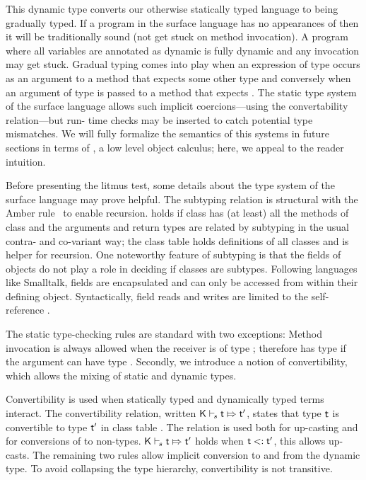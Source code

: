 \documentclass[USenglish]{tex/lipics-v2016}
\begin{document}
This dynamic type converts our otherwise statically typed language to being
gradually typed. If a program in the surface language has no appearances of
\any then it will be traditionally sound (not get stuck on method invocation).
A program where all variables are annotated as dynamic is fully dynamic and
any invocation may get stuck. Gradual typing comes into play when an
expression  of type \any occurs as an argument to a method that expects some
other type \C  and conversely when an argument of type \C is passed to a
method that expects \any. The static type system of the surface language
allows such implicit coercions---using the convertability relation---but run-
time checks may be inserted to catch potential type mismatches. We will fully
formalize the semantics of this systems in future sections in terms of
\kafka, a low level object calculus; here, we appeal to the reader\s
intuition.

Before presenting the litmus test, some details about the type system of the
surface language may prove helpful. The subtyping relation is structural
with the Amber rule~\cite{cardelli1985amber} to enable recursion. \StrSub\M\K\C\D holds if class
\C has (at least) all the methods of class \D and the arguments and return
types are related by subtyping in the usual contra- and co-variant way; the
class table \K holds definitions of all classes and \M is helper for
recursion. One noteworthy feature of subtyping is that the fields of objects
do not play a role in deciding if classes are subtypes. Following languages
like Smalltalk, fields are encapsulated and can only be accessed from within their
defining object. Syntactically, field reads and writes are limited to
the self-reference \this. 

The static type-checking rules are standard with two exceptions:
Method invocation is always allowed when the receiver \e is of 
type \any; therefore  has type \any if the argument
can have type \any. Secondly, we introduce a notion of convertibility, 
which allows the mixing of static and dynamic types. 

Convertibility is used when statically typed and dynamically typed terms
interact. The convertibility relation, written $\ConvertE\K s\t\tp$, states
that type $\t$ is convertible to type $\tp$ in class table \K.  The relation
is used both for up-casting and for conversions of \any to non-\any types.
$\ConvertE\K s\t\tp$ holds when $\t\Sub\tp$, this allows up-casts. The
remaining two rules allow implicit conversion to and from the dynamic type.
To avoid collapsing the type hierarchy, convertibility is not transitive.
\end{document}
